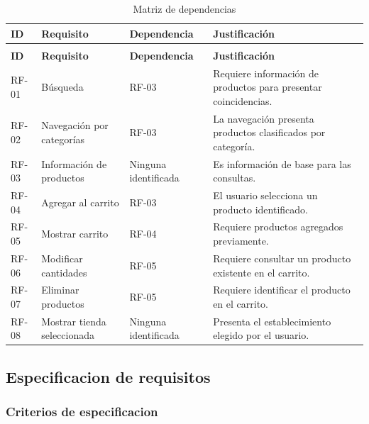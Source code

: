 \documentclass[12pt,a4paper]{article}
\renewcommand{\arraystretch}{1.17}
\begin{document}
\begingroup
\footnotesize
\setlength{\tabcolsep}{3pt}
\renewcommand{\arraystretch}{1.22}
\begin{longtable}{|>{\raggedright\arraybackslash}p{1.4cm}|>{\raggedright\arraybackslash}p{3.4cm}|>{\raggedright\arraybackslash}p{2.5cm}|>{\raggedright\arraybackslash}p{6.65cm}|}
\caption{Matriz de dependencias}\\
\hline
\textbf{ID} & \textbf{Requisito} & \textbf{Dependencia} & \textbf{Justificación} \\
\hline
\endfirsthead
\multicolumn{4}{c}{\textit{Continuación: Matriz de dependencias}}\\
\hline
\textbf{ID} & \textbf{Requisito} & \textbf{Dependencia} & \textbf{Justificación} \\
\hline
\endhead
RF-01 & Búsqueda & RF-03 & Requiere información de productos para presentar coincidencias. \\
\hline
RF-02 & Navegación por categorías & RF-03 & La navegación presenta productos clasificados por categoría. \\
\hline
RF-03 & Información de productos & Ninguna identificada & Es información de base para las consultas. \\
\hline
RF-04 & Agregar al carrito & RF-03 & El usuario selecciona un producto identificado. \\
\hline
RF-05 & Mostrar carrito & RF-04 & Requiere productos agregados previamente. \\
\hline
RF-06 & Modificar cantidades & RF-05 & Requiere consultar un producto existente en el carrito. \\
\hline
RF-07 & Eliminar productos & RF-05 & Requiere identificar el producto en el carrito. \\
\hline
RF-08 & Mostrar tienda seleccionada & Ninguna identificada & Presenta el establecimiento elegido por el usuario. \\
\hline
\end{longtable}
\endgroup

\subsection{Especificacion de requisitos}

\subsubsection{Criterios de especificacion}
\end{document}
